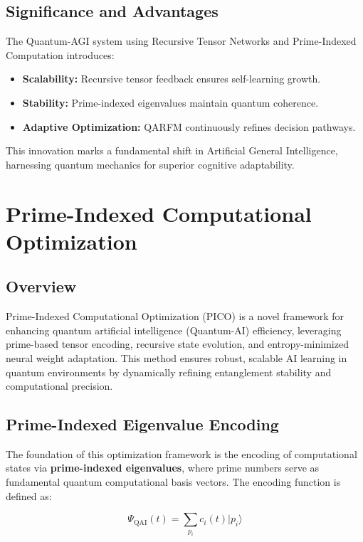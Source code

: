 \documentclass{article}
\theoremstyle{plain}
\begin{document}
\subsection{Significance and Advantages}
The Quantum-AGI system using Recursive Tensor Networks and Prime-Indexed Computation introduces:
\begin{itemize}
    \item \textbf{Scalability:} Recursive tensor feedback ensures self-learning growth.
    \item \textbf{Stability:} Prime-indexed eigenvalues maintain quantum coherence.
    \item \textbf{Adaptive Optimization:} QARFM continuously refines decision pathways.
\end{itemize}
This innovation marks a fundamental shift in Artificial General Intelligence, harnessing quantum mechanics for superior cognitive adaptability.

\section{Prime-Indexed Computational Optimization}

\subsection{Overview}

Prime-Indexed Computational Optimization (PICO) is a novel framework for enhancing quantum artificial intelligence (Quantum-AI) efficiency, leveraging prime-based tensor encoding, recursive state evolution, and entropy-minimized neural weight adaptation. This method ensures robust, scalable AI learning in quantum environments by dynamically refining entanglement stability and computational precision.

\subsection{Prime-Indexed Eigenvalue Encoding}

The foundation of this optimization framework is the encoding of computational states via \textbf{prime-indexed eigenvalues}, where prime numbers serve as fundamental quantum computational basis vectors. The encoding function is defined as:

\begin{equation}
    \Psi_{\text{QAI}}(t) = \sum_{p_i} c_{i}(t) |p_i\rangle
\end{equation}
\end{document}
